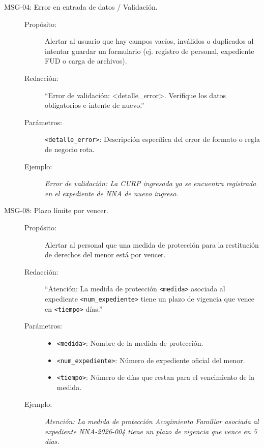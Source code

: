 \begin{description}
	\item[\hypertarget{mMSG04}{MSG-04: Error en entrada de datos / Validación.}] \cdtEmpty
		\begin{description}
			\item[Propósito:] Alertar al usuario que hay campos vacíos, inválidos o duplicados al intentar guardar un formulario (ej. registro de personal, expediente FUD o carga de archivos).
			\item[Redacción:] ``Error de validación: <detalle\_error>. Verifique los datos obligatorios e intente de nuevo.''
			\item[Parámetros:] \texttt{<detalle\_error>}: Descripción específica del error de formato o regla de negocio rota.
			\item[Ejemplo:] {\em Error de validación: La CURP ingresada ya se encuentra registrada en el expediente de NNA de nuevo ingreso.}
		\end{description}

	\item[\hypertarget{mMSG08}{MSG-08: Plazo límite por vencer.}] \cdtEmpty
		\begin{description}
			\item[Propósito:] Alertar al personal que una medida de protección para la restitución de derechos del menor está por vencer.
			\item[Redacción:] ``Atención: La medida de protección \texttt{<medida>} asociada al expediente \texttt{<num\_expediente>} tiene un plazo de vigencia que vence en \texttt{<tiempo>} días.''
			\item[Parámetros:] 
				\begin{itemize}
					\item \texttt{<medida>}: Nombre de la medida de protección.
					\item \texttt{<num\_expediente>}: Número de expediente oficial del menor.
					\item \texttt{<tiempo>}: Número de días que restan para el vencimiento de la medida.
				\end{itemize}
			\item[Ejemplo:] {\em Atención: La medida de protección Acogimiento Familiar asociada al expediente NNA-2026-004 tiene un plazo de vigencia que vence en 5 días.}
		\end{description}


\end{description}
